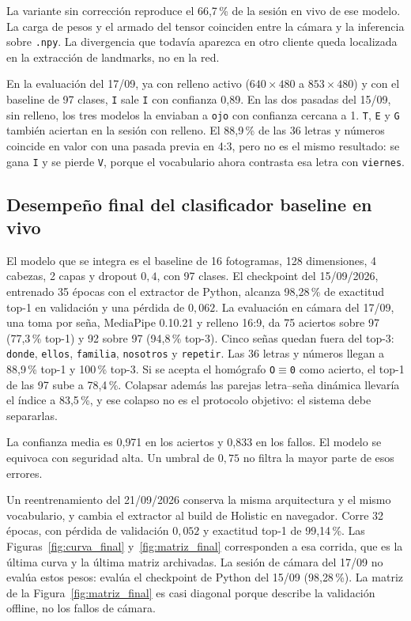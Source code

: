 La variante sin corrección reproduce el 66{,}7\,\% de la sesión en vivo de ese modelo. La carga de pesos y el armado del tensor coinciden entre la cámara y la inferencia sobre \texttt{.npy}. La divergencia que todavía aparezca en otro cliente queda localizada en la extracción de landmarks, no en la red.

En la evaluación del 17/09, ya con relleno activo ($640 \times 480$ a $853 \times 480$) y con el baseline de 97 clases, \texttt{I} sale \texttt{I} con confianza 0{,}89. En las dos pasadas del 15/09, sin relleno, los tres modelos la enviaban a \texttt{ojo} con confianza cercana a 1. \texttt{T}, \texttt{E} y \texttt{G} también aciertan en la sesión con relleno. El 88{,}9\,\% de las 36 letras y números coincide en valor con una pasada previa en 4:3, pero no es el mismo resultado: se gana \texttt{I} y se pierde \texttt{V}, porque el vocabulario ahora contrasta esa letra con \texttt{viernes}.

\subsection{Desempeño final del clasificador baseline en vivo}

El modelo que se integra es el baseline de 16 fotogramas, 128 dimensiones, 4 cabezas, 2 capas y dropout $0{,}4$, con 97 clases. El checkpoint del 15/09/2026, entrenado 35 épocas con el extractor de Python, alcanza 98{,}28\,\% de exactitud top-1 en validación y una pérdida de $0{,}062$. La evaluación en cámara del 17/09, una toma por seña, MediaPipe 0.10.21 y relleno 16:9, da 75 aciertos sobre 97 (77{,}3\,\% top-1) y 92 sobre 97 (94{,}8\,\% top-3). Cinco señas quedan fuera del top-3: \texttt{donde}, \texttt{ellos}, \texttt{familia}, \texttt{nosotros} y \texttt{repetir}. Las 36 letras y números llegan a 88{,}9\,\% top-1 y 100\,\% top-3. Si se acepta el homógrafo \texttt{O}$\equiv$\texttt{0} como acierto, el top-1 de las 97 sube a 78{,}4\,\%. Colapsar además las parejas letra--seña dinámica llevaría el índice a 83{,}5\,\%, y ese colapso no es el protocolo objetivo: el sistema debe separarlas.

La confianza media es 0{,}971 en los aciertos y 0{,}833 en los fallos. El modelo se equivoca con seguridad alta. Un umbral de $0{,}75$ no filtra la mayor parte de esos errores.

Un reentrenamiento del 21/09/2026 conserva la misma arquitectura y el mismo vocabulario, y cambia el extractor al build de Holistic en navegador. Corre 32 épocas, con pérdida de validación $0{,}052$ y exactitud top-1 de 99{,}14\,\%. Las Figuras~\ref{fig:curva_final} y~\ref{fig:matriz_final} corresponden a esa corrida, que es la última curva y la última matriz archivadas. La sesión de cámara del 17/09 no evalúa estos pesos: evalúa el checkpoint de Python del 15/09 (98{,}28\,\%). La matriz de la Figura~\ref{fig:matriz_final} es casi diagonal porque describe la validación offline, no los fallos de cámara.

